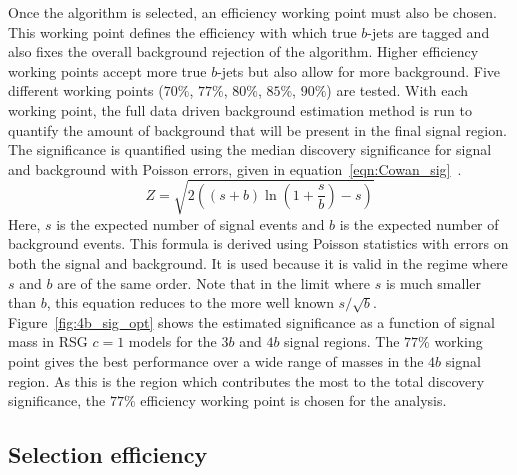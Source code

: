 Once the algorithm is selected, an efficiency working point must also be chosen. This working point defines the efficiency with which true $b$-jets are tagged and also fixes the overall background rejection of the algorithm. Higher efficiency working points accept more true $b$-jets but also allow for more background. Five different working points ($70\%$, $77\%$, $80\%$, $85\%$, $90\%$) are tested. With each working point, the full data driven background estimation method is run to quantify the amount of background that will be present in the final signal region. The significance is quantified using the median discovery significance for signal and background with Poisson errors, given in equation~\ref{eqn:Cowan_sig}~\cite{CowanSig}. 
%
\begin{equation}
\label{eqn:Cowan_sig}
Z = \sqrt{2\left((s+b)\ln\left(1+\frac{s}{b}\right) - s\right)}
\end{equation}
%
Here, $s$ is the expected number of signal events and $b$ is the expected number of background events. This formula is derived using Poisson statistics with errors on both the signal and background. It is used because it is valid in the regime where $s$ and $b$ are of the same order. Note that in the limit where $s$ is much smaller than $b$, this equation reduces to the more well known $s/\sqrt{b}$. Figure~\ref{fig:4b_sig_opt} shows the estimated significance as a function of signal mass in RSG $c=1$ models for the $3b$ and $4b$ signal regions. The $77\%$ working point gives the best performance over a wide range of masses in the $4b$ signal region. As this is the region which contributes the most to the total discovery significance, the $77\%$ efficiency working point is chosen for the analysis. 

\subsection{Selection efficiency}

